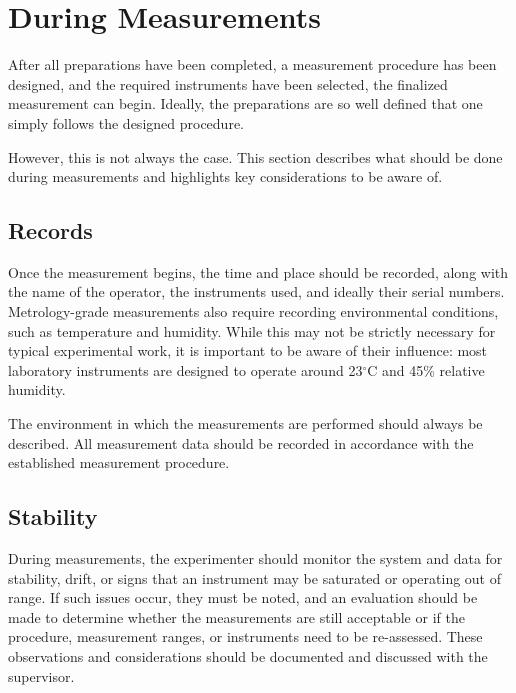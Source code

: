 \section{During Measurements}
After all preparations have been completed, a measurement procedure has been designed, and the required instruments have been selected, the finalized measurement can begin. Ideally, the preparations are so well defined that one simply follows the designed procedure.

However, this is not always the case. This section describes what should be done during measurements and highlights key considerations to be aware of.

\subsection{Records}
Once the measurement begins, the time and place should be recorded, along with the name of the operator, the instruments used, and ideally their serial numbers. Metrology-grade measurements also require recording environmental conditions, such as temperature and humidity. While this may not be strictly necessary for typical experimental work, it is important to be aware of their influence: most laboratory instruments are designed to operate around 23$^\circ$C and 45\% relative humidity.

The environment in which the measurements are performed should always be described. All measurement data should be recorded in accordance with the established measurement procedure.

\subsection{Stability}
During measurements, the experimenter should monitor the system and data for stability, drift, or signs that an instrument may be saturated or operating out of range. If such issues occur, they must be noted, and an evaluation should be made to determine whether the measurements are still acceptable or if the procedure, measurement ranges, or instruments need to be re-assessed. These observations and considerations should be documented and discussed with the supervisor.
